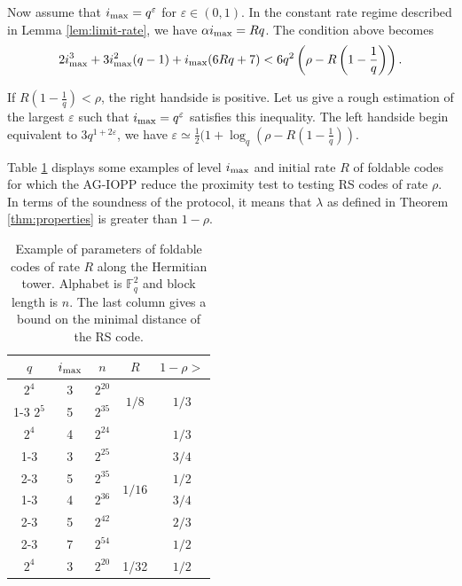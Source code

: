 \documentclass[a4paper,USenglish,autoref]{lipics-v2021}
\renewcommand\epsilon{\varepsilon}
\newcommand\F{\mathbb{F}}
\newcommand{\ii}{i_{\rm{max}}}
\begin{document}
Now assume that $\ii=q^{\varepsilon}$ for $\varepsilon \in (0,1)$. In the constant rate regime described in Lemma \ref{lem:limit-rate}, we have $\alpha \ii = Rq$. The condition above becomes 
\[2\ii^3 + 3\ii^2(q-1) + \ii(6Rq+7)< 6q^2\left(\rho-R\left(1-\frac{1}{q}\right)\right) .\]

If $R\left(1-\frac{1}{q}\right) < \rho$, the right handside is positive. Let us give a rough estimation of the largest $\epsilon$ such that $\ii=q^\epsilon$ satisfies this inequality. The left handside begin equivalent to $3q^{1+2\epsilon}$, we have $\epsilon \simeq \frac{1}{2}(1+\log_q\left(\rho-R\left(1-\frac{1}{q}\right)\right)$.

Table \ref{table:param-HT} displays some examples of level $\ii$ and initial rate $R$ of foldable codes for which the AG-IOPP reduce the proximity test to testing RS codes of rate $\rho$. In terms of the soundness of the protocol, it means that $\lambda$ as defined in Theorem \ref{thm:properties} is greater than $1-\rho$.


\begin{table}[H]
	\centering
	\renewcommand{\arraystretch}{1.2}
	\begin{tabular}{|c|c|c|c|c|}
		\hline
		$q$      & $\ii$ & $n$  & $R$    & $1-\rho>$   \\\hline
		$2^4$      & 3  & $2^{20}$ & \multirow{2}{*}{$1/8$} & \multirow{2}{*}{$1/3$} \\ \cline{1-3}
		$2^5$      & 5  & $2^{35}$ &         &          \\\hline
		$2^4$      & 4  & $2^{24}$ & \multirow{6}{*}{$1/16$} & $1/3$ \\ \cline{1-3} \cline{5-5}
		\multirow{2}{*}{$2^5$}  & 3  & $2^{25}$ &  & $3/4$ \\ \cline{2-3} \cline{5-5}
		& 5  & $2^{35}$ &  & $1/2$ \\ \cline{1-3} \cline{5-5}
		\multirow{3}{*}{$2^6$}      & 4  & $2^{36}$ &  & $3/4$ \\ \cline{2-3} \cline{5-5}
		& 5  & $2^{42}$ &  & $2/3$ \\ \cline{2-3} \cline{5-5}
		& 7  & $2^{54}$ &  & $1/2$ \\ \hline
		$2^4$      & 3  & $2^{20}$ & 1/32 & $1/2$ \\ \hline
	\end{tabular}
	\renewcommand{\arraystretch}{1}
	\caption{Example of parameters of foldable codes of rate $R$ along the Hermitian tower. Alphabet is $\F_q^2$ and block length is $n$. The last column gives a bound on the minimal distance of the RS code.}\label{table:param-HT}
\end{table}
\end{document}
